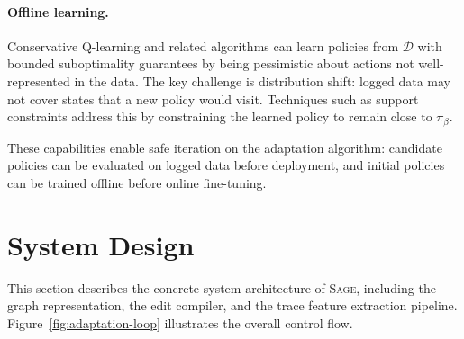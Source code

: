 \documentclass[sigconf,anonymous]{acmart}
\newcommand{\SAGE}{\textsc{Sage}\xspace}
\newcommand{\figref}[1]{Figure~\ref{#1}}
\begin{document}
\paragraph{Offline learning.} Conservative Q-learning and related algorithms can learn policies from $\mathcal{D}$ with bounded suboptimality guarantees by being pessimistic about actions not well-represented in the data. The key challenge is distribution shift: logged data may not cover states that a new policy would visit. Techniques such as support constraints address this by constraining the learned policy to remain close to $\pi_\beta$.

These capabilities enable safe iteration on the adaptation algorithm: candidate policies can be evaluated on logged data before deployment, and initial policies can be trained offline before online fine-tuning.

\section{System Design}
\label{sec:system}

This section describes the concrete system architecture of \SAGE, including the graph representation, the edit compiler, and the trace feature extraction pipeline. \figref{fig:adaptation-loop} illustrates the overall control flow.
\end{document}
